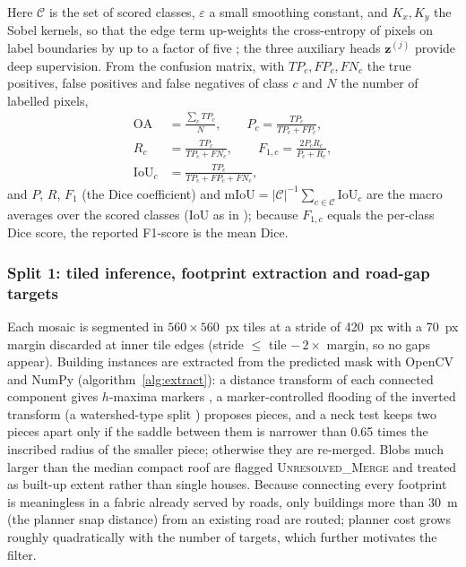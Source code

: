 \documentclass[preprint,12pt]{elsarticle}
\begin{document}
Here $\mathcal C$ is the set of scored classes, $\varepsilon$ a small smoothing constant, and $K_x,K_y$ the Sobel kernels, so that the edge term up-weights the cross-entropy of pixels on label boundaries by up to a factor of five \cite{milletari2016vnet}; the three auxiliary heads $\mathbf z^{(j)}$ provide deep supervision. From the confusion matrix, with $TP_c,FP_c,FN_c$ the true positives, false positives and false negatives of class $c$ and $N$ the number of labelled pixels,
\begin{equation}
\begin{aligned}
\mathrm{OA}&=\frac{\sum_c TP_c}{N},\qquad P_c=\frac{TP_c}{TP_c+FP_c},\\
R_c&=\frac{TP_c}{TP_c+FN_c},\qquad F_{1,c}=\frac{2P_cR_c}{P_c+R_c},\\
\mathrm{IoU}_c&=\frac{TP_c}{TP_c+FP_c+FN_c},
\end{aligned}
\label{eq:metrics}
\end{equation}
and $P$, $R$, $F_1$ (the Dice coefficient) and $\mathrm{mIoU}=|\mathcal C|^{-1}\sum_{c\in\mathcal C}\mathrm{IoU}_c$ are the macro averages over the scored classes (IoU as in \cite{everingham2010voc}); because $F_{1,c}$ equals the per-class Dice score, the reported F1-score is the mean Dice.

\subsubsection{Split 1: tiled inference, footprint extraction and road-gap targets}\label{sec:extract}
Each mosaic is segmented in $560\times560$~px tiles at a stride of 420~px with a 70~px margin discarded at inner tile edges (stride $\le$ tile $-\,2\times$ margin, so no gaps appear). Building instances are extracted from the predicted mask with OpenCV and NumPy \cite{bradski2000opencv,harris2020numpy} (algorithm~\ref{alg:extract}): a distance transform of each connected component \cite{felzenszwalb2012edt} gives $h$-maxima markers \cite{vincent1993morph}, a marker-controlled flooding of the inverted transform (a watershed-type split \cite{vincent1991watershed}) proposes pieces, and a neck test keeps two pieces apart only if the saddle between them is narrower than 0.65 times the inscribed radius of the smaller piece; otherwise they are re-merged. Blobs much larger than the median compact roof are flagged \textsc{Unresolved\_Merge} and treated as built-up extent rather than single houses. Because connecting every footprint is meaningless in a fabric already served by roads, only buildings more than 30~m (the planner snap distance) from an existing road are routed; planner cost grows roughly quadratically with the number of targets, which further motivates the filter.
\end{document}
